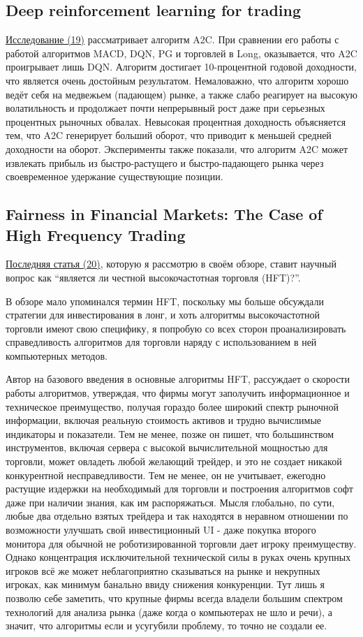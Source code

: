 \documentclass[a4paper,14pt]{extarticle}
\newcommand{\bibref}[3]{\hyperlink{#1}{#2 (#3)}} %
\begin{document}
\subsection{Deep reinforcement learning for trading}

\bibref{19}{Исследование}{19} рассматривает алгоритм A2C. При сравнении его работы с работой алгоритмов MACD, DQN, PG и торговлей в Long, оказывается, что A2C проигрывает лишь DQN. Алгоритм достигает 10-процентной годовой доходности, что является очень достойным результатом. Немаловажно, что алгоритм хорошо ведёт себя на медвежьем (падающем) рынке, а также слабо реагирует на высокую волатильность и продолжает почти непрерывный рост даже при серьезных процентных рыночных обвалах. Невысокая процентная доходность объясняется тем, что A2C генерирует больший оборот, что приводит к меньшей средней доходности на оборот. Эксперименты также показали, что алгоритм A2C может извлекать прибыль из быстро-растущего и быстро-падающего рынка через своевременное удержание существующие позиции.

\subsection{Fairness in Financial Markets: The Case of High Frequency Trading}

\bibref{20}{Последняя статья}{20}, которую я рассмотрю в своём обзоре, ставит научный вопрос как “является ли честной высокочастотная торговля (HFT)?”. 

В обзоре мало упоминался термин HFT, поскольку мы больше обсуждали стратегии для инвестирования в лонг, и хоть алгоритмы высокочастотной торговли имеют свою специфику, я попробую со всех сторон проанализировать справедливость алгоритмов для торговли наряду с использованием в ней компьютерных методов.

Автор на базового введения в основные алгоритмы HFT, рассуждает о скорости работы алгоритмов, утверждая, что фирмы могут заполучить информационное и техническое преимущество, получая гораздо более широкий спектр рыночной информации, включая реальную стоимость активов и трудно вычислимые индикаторы и показатели. Тем не менее, позже он пишет, что большинством инструментов, включая сервера с высокой вычислительной мощностью для торговли, может овладеть любой желающий трейдер, и это не создает никакой конкурентной несправедливости. Тем не менее, он не учитывает, ежегодно растущие издержки на необходимый для торговли и построения алгоритмов софт даже при наличии знания, как им распоряжаться. Мысля глобально, по сути, любые два отдельно взятых трейдера и так находятся в неравном отношении по возможности улучшать свой инвестиционный UI - даже покупка второго монитора для обычной не роботизированной торговли дает игроку преимуществу. Однако концентрация исключительной технической силы в руках очень крупных игроков всё же может неблагоприятно сказываться на рынке и некрупных игроках, как минимум банально ввиду снижения конкуренции. Тут лишь я позволю себе заметить, что крупные фирмы всегда владели большим спектром технологий для анализа рынка (даже когда о компьютерах не шло и речи), а значит, что алгоритмы если и усугубили проблему, то точно не создали ее.
\end{document}
